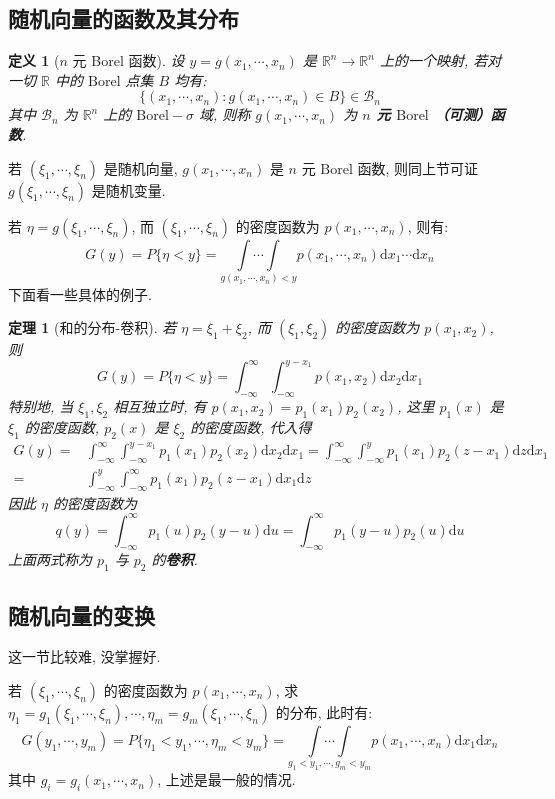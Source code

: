 \documentclass[12pt,a4paper]{article}
\newtheorem{thm}{定理}[subsection]  %
\newtheorem{definition}{定义}[subsection] %
\begin{document}
\subsection{随机向量的函数及其分布}
\begin{definition}[$n$ 元 Borel 函数]
    设 $y = g(x_1, \cdots, x_n)$ 是 $\mathbb{R}^n \to \mathbb{R}^n$ 上的一个映射, 若对一切 $\mathbb{R}$ 中的 $\mathrm{Borel}$ 点集 $B$ 均有:
    \[\{(x_1, \cdots, x_n): g(x_1, \cdots, x_n ) \in B \} \in \mathscr{B}_n \]
    其中 $\mathscr{B}_n$ 为 $\mathbb{R}^n$ 上的 $\mathrm{Borel}-\sigma$ 域, 则称 $g(x_1, \cdots, x_n)$ 为 \textbf{$n$ 元 $\mathrm{Borel}$ （可测）函数}.
\end{definition}
若 $(\xi_1, \cdots, \xi_n)$ 是随机向量, $g(x_1, \cdots, x_n)$ 是 $n$ 元 $\mathrm{Borel}$ 函数, 则同上节可证 $g(\xi_1, \cdots, \xi_n)$ 是随机变量.

若 $\eta = g(\xi_1, \cdots, \xi_n)$, 而 $(\xi_1, \cdots, \xi_n)$ 的密度函数为 $p(x_1, \cdots, x_n)$, 则有:
\[G(y) = P\{\eta<y\} = \underset{g(x_1, \cdots, x_n)<y}{\int \cdots \int} p(x_1, \cdots, x_n) \mathrm{d}x_1 \cdots \mathrm{d}x_n\]
下面看一些具体的例子.
\begin{thm}[和的分布-卷积]
    若 $\eta = \xi_1 + \xi_2$, 而 $(\xi_1, \xi_2)$ 的密度函数为 $p(x_1, x_2)$, 则
    \[G(y) = P\{\eta<y\} = \int_{-\infty}^{\infty} \int_{-\infty}^{y-x_1} p(x_1, x_2) \mathrm{d}x_2 \mathrm{d}x_1\]
    特别地, 当 $\xi_1, \xi_2$ 相互独立时, 有 $p(x_1, x_2) = p_1(x_1)p_2(x_2)$, 这里 $p_1(x)$ 是 $\xi_1$ 的密度函数, $p_2(x)$ 是 $\xi_2$ 的密度函数, 代入得
    \[\begin{aligned}G(y) =& \int_{-\infty}^{\infty} \int_{-\infty}^{y-x_1} p_1(x_1)p_2(x_2) \mathrm{d}x_2 \mathrm{d}x_1 = \int_{-\infty}^{\infty} \int_{-\infty}^{y} p_1(x_1)p_2(z-x_1) \mathrm{d}z \mathrm{d}x_1 \\
    =& \int_{-\infty}^{y}\int_{-\infty}^{\infty} p_1(x_1)p_2(z-x_1) \mathrm{d}x_1 \mathrm{d}z\end{aligned}\]
    因此 $\eta$ 的密度函数为 \[ q(y) = \int_{-\infty}^{\infty} p_1(u)p_2(y-u) \mathrm{d}u = \int_{-\infty}^{\infty} p_1(y-u)p_2(u) \mathrm{d}u\]
    上面两式称为 $p_1$ 与 $p_2$ 的\textbf{卷积}.
\end{thm}
\subsection{随机向量的变换}
这一节比较难, 没掌握好. 

若 $(\xi_1, \cdots, \xi_n)$ 的密度函数为 $p(x_1, \cdots, x_n)$, 求 $\eta_1 = g_1(\xi_1, \cdots, \xi_n), \cdots, \eta_m = g_m(\xi_1, \cdots, \xi_n)$ 的分布, 此时有:
\[G(y_1, \cdots, y_m) = P\{\eta_1<y_1, \cdots, \eta_m<y_m\} = \underset{g_1<y_1, \cdots, g_m<y_m}{\int \cdots \int} p(x_1, \cdots, x_n) \mathrm{d}x_1 \mathrm{d}x_n\]
其中 $g_i = g_i(x_1, \cdots, x_n)$, 上述是最一般的情况.
\end{document}
